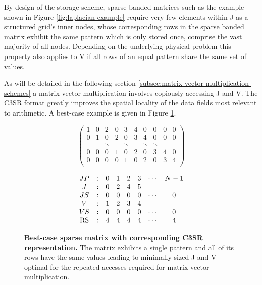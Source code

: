     By design of the storage scheme, sparse banded matrices such as the example shown in Figure
    \ref{fig:laplacian-example} require very few elements within J as a structured grid's inner nodes, whose
    corresponding rows in the sparse banded matrix exhibit the same pattern which is only stored once, comprise the vast
    majority of all nodes. Depending on the underlying physical problem this property also applies to V if all rows of
    an equal pattern share the same set of values. 

    As will be detailed in the following section \ref{subsec:matrix-vector-multiplication-schemes} a matrix-vector
    multiplication involves copiously accessing J and V. The C3SR format greatly improves the spatial locality of the
    data fields most relevant to arithmetic. A best-case example is given in Figure \ref{fig:c3sr-example-best-case}.

    \begin{figure}[ht]
      \centering
      \begin{minipage}{0.5\textwidth}
        \centering
        $$
        \begin{pmatrix}
          1 & 0 & 2 & 0 & 3 & 4 & 0 & 0 & 0 & 0 \\
          0 & 1 & 0 & 2 & 0 & 3 & 4 & 0 & 0 & 0 \\
            &   & \ddots &   & \ddots &   & \ddots & \ddots \\
          0 & 0 & 0 & 1 & 0 & 2 & 0 & 3 & 4 & 0 \\
          0 & 0 & 0 & 0 & 1 & 0 & 2 & 0 & 3 & 4 \\
        \end{pmatrix}
        $$
      \end{minipage}
      \begin{minipage}{0.4\textwidth}
        \centering
        $$
        \begin{matrix}
          JP & : & 0 & 1 & 2 & 3 & \cdots & N-1 \\
           J & : & 0 & 2 & 4 & 5 &        &     \\
          JS & : & 0 & 0 & 0 & 0 & \cdots &  0  \\
           V & : & 1 & 2 & 3 & 4 &        &     \\
          VS & : & 0 & 0 & 0 & 0 & \cdots &  0  \\
          \RS & : & 4 & 4 & 4 & 4 & \cdots &  4  \\
        \end{matrix}
        $$
      \end{minipage}
      \caption[Best-case sparse matrix with corresponding C3SR representation.]{\textbf{Best-case sparse matrix with corresponding C3SR representation.} The matrix exhibits a single pattern and all of its rows have the same values leading to minimally sized J and V optimal for the repeated accesses required for matrix-vector multiplication.}
      \label{fig:c3sr-example-best-case}
    \end{figure}

